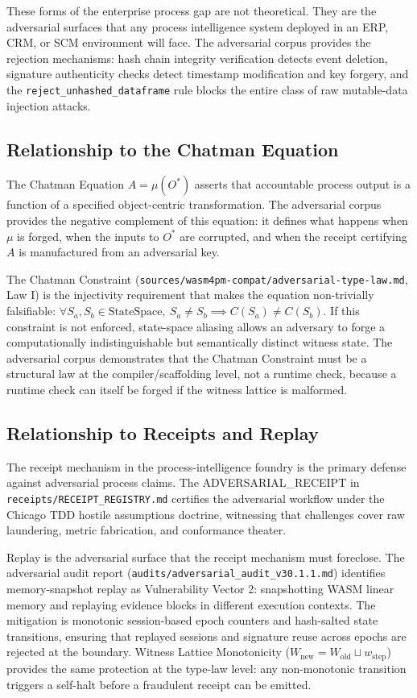These forms of the enterprise process gap are not theoretical. They are the adversarial
surfaces that any process intelligence system deployed in an ERP, CRM, or SCM environment
will face. The adversarial corpus provides the rejection mechanisms: hash chain integrity
verification detects event deletion, signature authenticity checks detect timestamp
modification and key forgery, and the \texttt{reject\_unhashed\_dataframe} rule blocks the
entire class of raw mutable-data injection attacks.

\subsection{Relationship to the Chatman Equation}
\label{sec:adversarial-lineage-chatman-equation}

The Chatman Equation $A = \mu(O^*)$ asserts that accountable process output is a function of
a specified object-centric transformation. The adversarial corpus provides the negative
complement of this equation: it defines what happens when $\mu$ is forged, when the inputs to
$O^*$ are corrupted, and when the receipt certifying $A$ is manufactured from an adversarial
key.

The Chatman Constraint (\texttt{sources/wasm4pm-compat/adversarial-type-law.md}, Law I) is
the injectivity requirement that makes the equation non-trivially falsifiable:
$\forall S_a, S_b \in \text{StateSpace},\ S_a \neq S_b \implies C(S_a) \neq C(S_b)$.
If this constraint is not enforced, state-space aliasing allows an adversary to forge a
computationally indistinguishable but semantically distinct witness state. The adversarial
corpus demonstrates that the Chatman Constraint must be a structural law at the
compiler/scaffolding level, not a runtime check, because a runtime check can itself be forged
if the witness lattice is malformed.

\subsection{Relationship to Receipts and Replay}
\label{sec:adversarial-lineage-receipts}

The receipt mechanism in the process-intelligence foundry is the primary defense against
adversarial process claims. The ADVERSARIAL\_RECEIPT in \texttt{receipts/RECEIPT\_REGISTRY.md}
certifies the adversarial workflow under the Chicago TDD hostile assumptions doctrine,
witnessing that challenges cover raw laundering, metric fabrication, and conformance theater.

Replay is the adversarial surface that the receipt mechanism must foreclose. The adversarial
audit report (\texttt{audits/adversarial\_audit\_v30.1.1.md}) identifies memory-snapshot
replay as Vulnerability Vector 2: snapshotting WASM linear memory and replaying evidence
blocks in different execution contexts. The mitigation is monotonic session-based epoch
counters and hash-salted state transitions, ensuring that replayed sessions and signature
reuse across epochs are rejected at the boundary. Witness Lattice Monotonicity
($W_{\text{new}} = W_{\text{old}} \sqcup w_{\text{step}}$) provides the same protection at
the type-law level: any non-monotonic transition triggers a self-halt before a fraudulent
receipt can be emitted.
